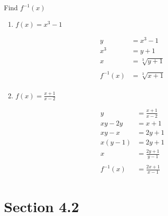 \documentclass{exam}
\begin{document}
  Find $f^{-1}(x)$

  \begin{enumerate}

    \item $f(x) = x^3 - 1$ 
      \begin{solution}
        \begin{align*}
          y   &= x^3 - 1 \\
          x^3 &= y + 1 \\
          x   &= \sqrt[3]{y + 1} \\
          \\
          f^{-1}(x) &= \boxed{\sqrt[3]{x + 1}} \\
        \end{align*}
      \end{solution}

    \ifprintanswers
      \pagebreak
    \fi

    \item $f(x) = \frac{x + 1}{x - 2}$
      \begin{solution}
        \begin{align*}
          y        &= \frac{x + 1}{x - 2} \\
          xy - 2y  &= x + 1 \\
          xy - x   &= 2y + 1 \\
          x(y - 1) &= 2y + 1 \\
          x        &= \frac{2y + 1}{y - 1} \\
          \\
          f^{-1}(x) &= \boxed{\frac{2x + 1}{x - 1}} \\
        \end{align*}
      \end{solution}

  \end{enumerate}

  \ifprintanswers
    \section{Section 4.2}
\end{document}
